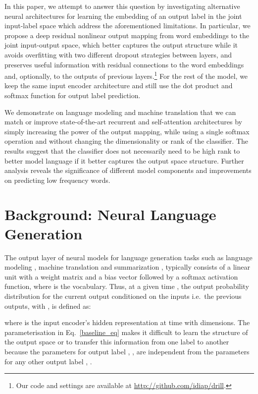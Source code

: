 \documentclass{article}
\begin{document}
In this paper, we attempt to answer this question by investigating alternative neural architectures for learning the embedding of an output label in the joint input-label space which address the aforementioned limitations. In particular, we propose a deep residual nonlinear output mapping from word embeddings to the joint input-output space, which better captures the output structure while it avoids overfitting with two different dropout strategies between layers, and preserves useful information with residual connections to the word embeddings and, optionally, to the outputs of previous layers.\footnote{Our code and settings are available at \url{http://github.com/idiap/drill}.} For the rest of the model, we keep the same input encoder architecture and still use the dot product and softmax function for output label prediction.  
 
We demonstrate on language modeling and machine translation that we can match or improve state-of-the-art recurrent and self-attention architectures by simply increasing the power of the output mapping, while using a single softmax operation and without changing the dimensionality or rank of the classifier. The results suggest that the classifier does not necessarily need to be high rank to better model language if it better captures the output space structure. Further analysis reveals the significance of different model components and  improvements on predicting low frequency words.
 
    

\section{Background: Neural Language Generation}
\label{background}
  
The output layer of neural models for language generation tasks such as language modeling \cite{bengio2003,mikolov2012context,merity2017regularizing},  machine translation \cite{Bahdanau15,luong15,TACL1081} and summarization \cite{rush15,paulus2018a}, typically consists of a linear unit with a weight matrix  and a bias vector   followed by a softmax activation function,  where  is the vocabulary.  
Thus, at a given time , the output probability distribution for the current output   conditioned on the inputs i.e.\ the previous outputs,  with , is defined as:

where  is the input encoder's hidden representation at time  with  dimensions. The parameterisation in Eq.~\ref{baseline_eq} makes it difficult to learn the structure of the output space or to transfer this information from one label to another because the parameters for output label ,  , are independent from the parameters for any other output label , .
\end{document}
